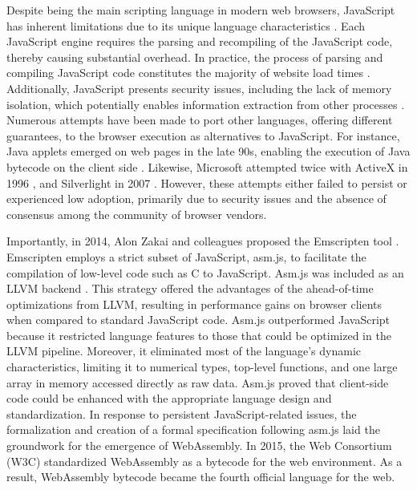 Despite being the main scripting language in modern web browsers, JavaScript has inherent limitations due to its unique language characteristics \cite{mulazzani2013fast}.
Each JavaScript engine requires the parsing and recompiling of the JavaScript code, thereby causing substantial overhead.
In practice, the process of parsing and compiling JavaScript code constitutes the majority of website load times .
Additionally, JavaScript presents security issues, including the lack of memory isolation, which potentially enables information extraction from other processes \cite{10.1145/1190216.1190252, 10.1145/3412841.3442001}.
Numerous attempts have been made to port other languages, offering different guarantees, to the browser execution as alternatives to JavaScript.
For instance, Java applets emerged on web pages in the late 90s, enabling the execution of Java bytecode on the client side .
Likewise, Microsoft attempted twice with ActiveX in 1996 , and Silverlight in 2007 .
However, these attempts either failed to persist or experienced low adoption, primarily due to security issues and the absence of consensus among the community of browser vendors.



Importantly, in 2014, Alon Zakai and colleagues proposed the Emscripten tool .
Emscripten employs a strict subset of JavaScript, asm.js, to facilitate the compilation of low-level code such as C to JavaScript.
Asm.js was included as an LLVM backend .
This strategy offered the advantages of the ahead-of-time optimizations from LLVM, resulting in performance gains on browser clients  when compared to standard JavaScript code.
Asm.js outperformed JavaScript because it restricted language features to those that could be optimized in the LLVM pipeline. 
Moreover, it eliminated most of the language's dynamic characteristics, limiting it to numerical types, top-level functions, and one large array in memory accessed directly as raw data.
Asm.js proved that client-side code could be enhanced with the appropriate language design and standardization.
In response to persistent JavaScript-related issues, the formalization and creation of a formal specification following asm.js laid the groundwork for the emergence of WebAssembly.
In 2015, the Web Consortium (W3C) standardized WebAssembly as a bytecode for the web environment.
As a result, WebAssembly bytecode became the fourth official language for the web.


